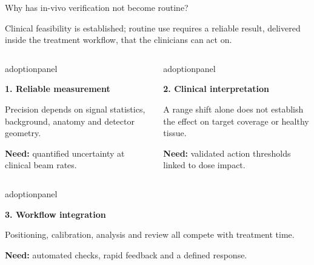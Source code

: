 \documentclass[aspectratio=169,11pt]{beamer}
\begin{document}
\begin{frame}{Why has in-vivo verification not become routine?}

{\small Clinical feasibility is established; routine use requires a reliable result, delivered inside the
treatment workflow, that the clinicians can act on.\par}
\vspace{0.18cm}

\begin{columns}[T,onlytextwidth]
\begin{beamercolorbox}[sep=6pt,wd=\linewidth]{adoptionpanel}
\begin{minipage}[t][1.65cm][t]{\linewidth}\raggedright
{\footnotesize\bfseries\color{crBlue}1. Reliable measurement\par}
\vspace{0.07cm}
{\scriptsize
Precision depends on signal statistics, background, anatomy and detector geometry.\par
\vspace{0.08cm}
\textbf{Need:} quantified uncertainty at clinical beam rates.\par}
\end{minipage}
\end{beamercolorbox}

\begin{beamercolorbox}[sep=6pt,wd=\linewidth]{adoptionpanel}
\begin{minipage}[t][1.65cm][t]{\linewidth}\raggedright
{\footnotesize\bfseries\color{crBlue}2. Clinical interpretation\par}
\vspace{0.07cm}
{\scriptsize
A range shift alone does not establish the effect on target coverage or healthy tissue.\par
\vspace{0.08cm}
\textbf{Need:} validated action thresholds linked to dose impact.\par}
\end{minipage}
\end{beamercolorbox}
\end{columns}

\par\vspace{0.22cm}
\begin{columns}[T,onlytextwidth]
\begin{beamercolorbox}[sep=6pt,wd=\linewidth]{adoptionpanel}
\begin{minipage}[t][1.65cm][t]{\linewidth}\raggedright
{\footnotesize\bfseries\color{crBlue}3. Workflow integration\par}
\vspace{0.07cm}
{\scriptsize
Positioning, calibration, analysis and review all compete with treatment time.\par
\vspace{0.08cm}
\textbf{Need:} automated checks, rapid feedback and a defined response.\par}
\end{minipage}
\end{beamercolorbox}


\end{columns}
\end{frame}
\end{document}
